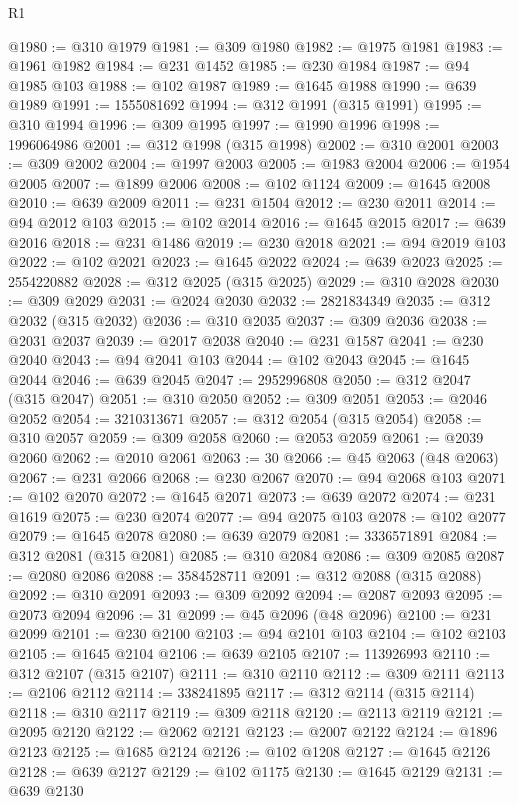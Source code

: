 \begin{lexlean}{R1}
\begin{coremodule}
@1980 := @310 @1979
@1981 := @309 @1980
@1982 := @1975 @1981
@1983 := @1961 @1982
@1984 := @231 @1452
@1985 := @230 @1984
@1987 := @94 @1985 @103
@1988 := @102 @1987
@1989 := @1645 @1988
@1990 := @639 @1989
@1991 := 1555081692
@1994 := @312 @1991 (@315 @1991)
@1995 := @310 @1994
@1996 := @309 @1995
@1997 := @1990 @1996
@1998 := 1996064986
@2001 := @312 @1998 (@315 @1998)
@2002 := @310 @2001
@2003 := @309 @2002
@2004 := @1997 @2003
@2005 := @1983 @2004
@2006 := @1954 @2005
@2007 := @1899 @2006
@2008 := @102 @1124
@2009 := @1645 @2008
@2010 := @639 @2009
@2011 := @231 @1504
@2012 := @230 @2011
@2014 := @94 @2012 @103
@2015 := @102 @2014
@2016 := @1645 @2015
@2017 := @639 @2016
@2018 := @231 @1486
@2019 := @230 @2018
@2021 := @94 @2019 @103
@2022 := @102 @2021
@2023 := @1645 @2022
@2024 := @639 @2023
@2025 := 2554220882
@2028 := @312 @2025 (@315 @2025)
@2029 := @310 @2028
@2030 := @309 @2029
@2031 := @2024 @2030
@2032 := 2821834349
@2035 := @312 @2032 (@315 @2032)
@2036 := @310 @2035
@2037 := @309 @2036
@2038 := @2031 @2037
@2039 := @2017 @2038
@2040 := @231 @1587
@2041 := @230 @2040
@2043 := @94 @2041 @103
@2044 := @102 @2043
@2045 := @1645 @2044
@2046 := @639 @2045
@2047 := 2952996808
@2050 := @312 @2047 (@315 @2047)
@2051 := @310 @2050
@2052 := @309 @2051
@2053 := @2046 @2052
@2054 := 3210313671
@2057 := @312 @2054 (@315 @2054)
@2058 := @310 @2057
@2059 := @309 @2058
@2060 := @2053 @2059
@2061 := @2039 @2060
@2062 := @2010 @2061
@2063 := 30
@2066 := @45 @2063 (@48 @2063)
@2067 := @231 @2066
@2068 := @230 @2067
@2070 := @94 @2068 @103
@2071 := @102 @2070
@2072 := @1645 @2071
@2073 := @639 @2072
@2074 := @231 @1619
@2075 := @230 @2074
@2077 := @94 @2075 @103
@2078 := @102 @2077
@2079 := @1645 @2078
@2080 := @639 @2079
@2081 := 3336571891
@2084 := @312 @2081 (@315 @2081)
@2085 := @310 @2084
@2086 := @309 @2085
@2087 := @2080 @2086
@2088 := 3584528711
@2091 := @312 @2088 (@315 @2088)
@2092 := @310 @2091
@2093 := @309 @2092
@2094 := @2087 @2093
@2095 := @2073 @2094
@2096 := 31
@2099 := @45 @2096 (@48 @2096)
@2100 := @231 @2099
@2101 := @230 @2100
@2103 := @94 @2101 @103
@2104 := @102 @2103
@2105 := @1645 @2104
@2106 := @639 @2105
@2107 := 113926993
@2110 := @312 @2107 (@315 @2107)
@2111 := @310 @2110
@2112 := @309 @2111
@2113 := @2106 @2112
@2114 := 338241895
@2117 := @312 @2114 (@315 @2114)
@2118 := @310 @2117
@2119 := @309 @2118
@2120 := @2113 @2119
@2121 := @2095 @2120
@2122 := @2062 @2121
@2123 := @2007 @2122
@2124 := @1896 @2123
@2125 := @1685 @2124
@2126 := @102 @1208
@2127 := @1645 @2126
@2128 := @639 @2127
@2129 := @102 @1175
@2130 := @1645 @2129
@2131 := @639 @2130

\end{coremodule}
\end{lexlean}
